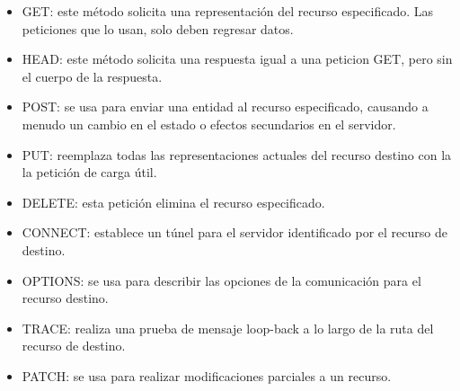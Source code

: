\begin{itemize}
	\item GET: este método solicita una representación del recurso especificado. Las peticiones que lo usan, solo deben regresar datos.
	\item HEAD: este método solicita una respuesta igual a una peticion GET, pero sin el cuerpo de la respuesta.
	\item POST: se usa para enviar una entidad al recurso especificado, causando a menudo un cambio en el estado o efectos secundarios en el servidor.
	\item PUT: reemplaza todas las representaciones actuales del recurso destino con la la petición de carga útil.
	\item DELETE: esta petición elimina el recurso especificado.
	\item CONNECT: establece un túnel para el servidor identificado por el recurso de destino.
	\item OPTIONS: se usa para describir las opciones de la comunicación para el recurso destino.
	\item TRACE: realiza una prueba de mensaje loop-back a lo largo de la ruta del recurso de destino. 
	\item PATCH: se usa para realizar modificaciones parciales a un recurso.
\end{itemize}










